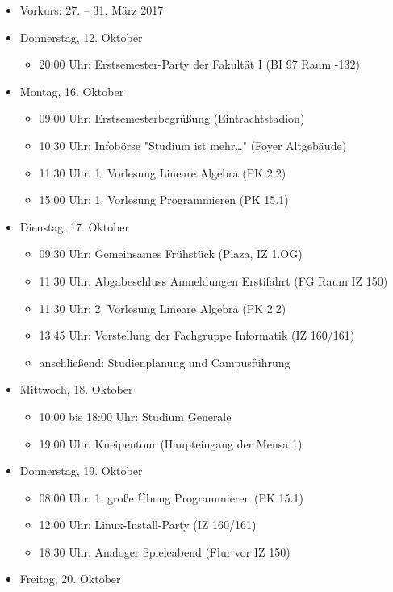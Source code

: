 \begin{itemize}
	\item Vorkurs: 27. – 31. März 2017
	\item Donnerstag, 12. Oktober
	\begin{itemize}
		\item 20:00 Uhr: Erstsemester-Party der Fakultät I (BI 97 Raum -132)
	\end{itemize}
	\item Montag, 16. Oktober
	\begin{itemize}
		\item 09:00 Uhr: Erstsemesterbegrüßung (Eintrachtstadion)
        \item 10:30 Uhr: Infobörse "Studium ist mehr…" (Foyer Altgebäude)
        \item 11:30 Uhr: 1. Vorlesung Lineare Algebra (PK 2.2)
        \item 15:00 Uhr: 1. Vorlesung Programmieren (PK 15.1)
	\end{itemize}
	\item Dienstag, 17. Oktober
	\begin{itemize}
		\item 09:30 Uhr: Gemeinsames Frühstück (Plaza, IZ 1.OG)
        \item 11:30 Uhr: Abgabeschluss Anmeldungen Erstifahrt (FG Raum IZ 150)
        \item 11:30 Uhr: 2. Vorlesung Lineare Algebra (PK 2.2)
        \item 13:45 Uhr: Vorstellung der Fachgruppe Informatik (IZ 160/161)
        \item anschließend: Studienplanung und Campusführung
	\end{itemize}
	\item Mittwoch, 18. Oktober
	\begin{itemize}
		\item 10:00 bis 18:00 Uhr: Studium Generale
        \item 19:00 Uhr: Kneipentour (Haupteingang der Mensa 1)
	\end{itemize}
	\item Donnerstag, 19. Oktober
	\begin{itemize}
		\item 08:00 Uhr: 1. große Übung Programmieren (PK 15.1)
        \item 12:00 Uhr: Linux-Install-Party (IZ 160/161)
        \item 18:30 Uhr: Analoger Spieleabend (Flur vor IZ 150)
	\end{itemize}
	\item Freitag, 20. Oktober

\end{itemize}
